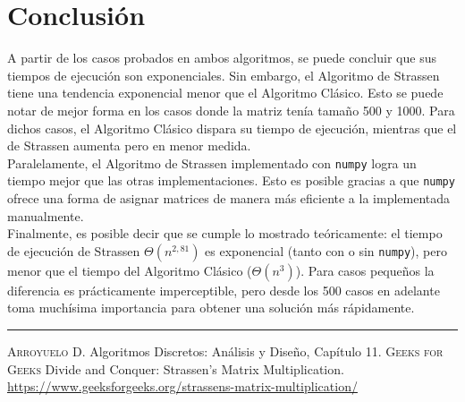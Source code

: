 \documentclass[a4paper,11pt]{article}
\begin{document}
\section{Conclusión}
A partir de los casos probados en ambos algoritmos, se puede concluir que sus tiempos de ejecución son exponenciales. Sin embargo, el Algoritmo de Strassen tiene una tendencia exponencial menor que el Algoritmo Clásico. Esto se puede notar de mejor forma en los casos donde la matriz tenía tamaño 500 y 1000. Para dichos casos, el Algoritmo Clásico dispara su tiempo de ejecución, mientras que el de Strassen aumenta pero en menor medida.\\

Paralelamente, el Algoritmo de Strassen implementado con \texttt{numpy} logra un tiempo mejor que las otras implementaciones. Esto es posible gracias a que \texttt{numpy} ofrece una forma de asignar matrices de manera más eficiente a la implementada manualmente.\\

Finalmente, es posible decir que se cumple lo mostrado teóricamente: el tiempo de ejecución de Strassen $\Theta(n^{2,81})$ es exponencial (tanto con o sin \texttt{numpy}), pero menor que el tiempo del Algoritmo Clásico ($\Theta(n^3)$). Para casos pequeños la diferencia es prácticamente imperceptible, pero desde los 500 casos en adelante toma muchísima importancia para obtener una solución más rápidamente.
\vfill
\vspace{.5cm}
\hrule
\vspace{.5cm}
\begin{thebibliography}{X}
 \textsc{Arroyuelo D.} Algoritmos Discretos: Análisis y Diseño, Capítulo 11.
 \textsc{Geeks for Geeks} Divide and Conquer: Strassen's Matrix Multiplication. \url{https://www.geeksforgeeks.org/strassens-matrix-multiplication/}
\end{thebibliography}
\end{document}
